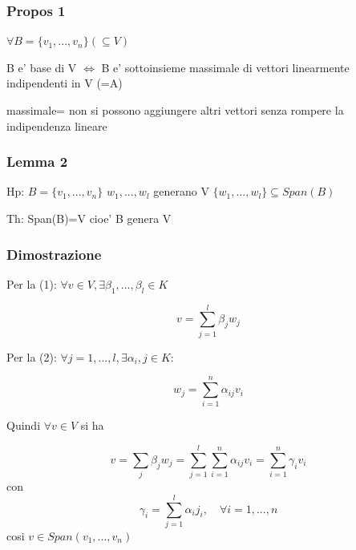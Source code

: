 \documentclass{article}
\begin{document}
\subsubsection*{Propos 1}
\begin{flushleft}
	$\forall B = \{v_1,...,v_n\} (\subseteq V)$
\end{flushleft}
\begin{flushleft}
	B e' base di V $\iff $ B e' sottoinsieme massimale di vettori linearmente indipendenti in V (=A)
\end{flushleft}
\begin{flushleft}
	massimale= non si possono aggiungere altri vettori senza rompere la indipendenza lineare
\end{flushleft}
\subsubsection*{Lemma 2}
\begin{flushleft}
	Hp: $B = \{ v_1,...,v_n \}$ $w_1,...,w_l$ generano V $\{w_1,...,w_l\} \subseteq Span(B)$
\end{flushleft}
\begin{flushleft}
	Th: Span(B)=V cioe' B genera V
\end{flushleft}
\subsubsection*{Dimostrazione}
\begin{flushleft}
	Per la (1): $\forall v \in V, \exists \beta_1,...,\beta_l \in K$
\end{flushleft}
\begin{equation*}
	v= \sum^l_{j=1}\beta_j w_j
\end{equation*}
\begin{flushleft}
	Per la (2): $\forall j=1,...,l,\exists \alpha_i,j \in K:$
\end{flushleft}
\begin{equation*}
	w_j = \sum_{i=1}^n \alpha_{ij}v_i
\end{equation*}
\begin{flushleft}
	Quindi $\forall v \in V$ si ha
\end{flushleft}
\begin{equation*}
	v = \sum_j \beta_j w_j= \sum^l_{j=1} \sum^n_{i=1} \alpha_{ij} v_i = \sum_{i=1}^n \gamma_i v_i
\end{equation*}
con
\begin{equation*}
	\gamma_i = \sum^l_{j=1} \alpha_i j_i, \quad \forall i=1,...,n
\end{equation*}
cosi $v \in Span(v_1,...,v_n)$
\end{document}
